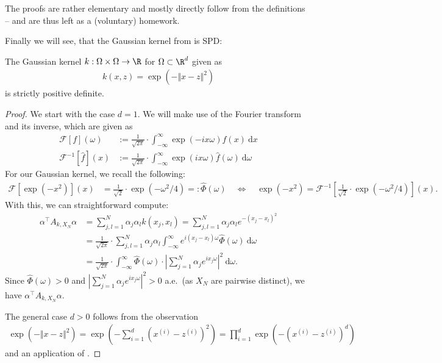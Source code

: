 The proofs are rather elementary and mostly directly follow from the definitions -- and are thus left as a (voluntary) homework.

Finally we will see, that the Gaussian kernel from  is SPD:

\begin{prop}
The Gaussian kernel $k: \Omega \times \Omega \rightarrow \R$ for $\Omega \subset \R^d$ given as
\begin{align*}
k(x, z) = \exp(-\Vert x - z \Vert^2)
\end{align*}
is strictly positive definite.
\end{prop}

\begin{proof}
We start with the case $d=1$.
We will make use of the Fourier transform and its inverse, which are given as
\begin{align*}
\mathcal{F}[f](\omega) &:= \frac{1}{\sqrt{2\pi}} \cdot \int_{-\infty}^\infty \exp(-ix\omega) f(x) ~ \mathrm{d}x \\
\mathcal{F}^{-1}[\hat{f}](x) &:= \frac{1}{\sqrt{2\pi}} \cdot \int_{-\infty}^\infty \exp(ix\omega) \hat{f}(\omega) ~ \mathrm{d}\omega
\end{align*}
For our Gaussian kernel, we recall the following:
\begin{align*}
\mathcal{F} \left[\exp(-x^2) \right](x) &=  \frac{1}{\sqrt{2}} \cdot \exp(-\omega^2 / 4) =: \hat{\Phi}(\omega) \quad \Leftrightarrow \quad
\exp(-x^2) = \mathcal{F}^{-1} \left[\frac{1}{\sqrt{2}} \cdot \exp(-\omega^2 / 4) \right](x).
\end{align*}
With this, we can straightforward compute:
\begin{align*}
\alpha^\top A_{k, X_N} \alpha &= \sum_{j, l=1}^N \alpha_j \alpha_l k(x_j, x_l) = \sum_{j, l=1}^N \alpha_j \alpha_l e^{-(x_j - x_l)^2} \\
&= \frac{1}{\sqrt{2\pi}} \cdot \sum_{j, l=1}^N \alpha_j \alpha_l \int_{-\infty}^\infty e^{i(x_j - x_l)\omega} \hat{\Phi}(\omega) ~ \mathrm{d}\omega \\
&= \frac{1}{\sqrt{2\pi}} \cdot \int_{-\infty}^\infty \hat{\Phi}(\omega) \cdot \left| \sum_{j=1}^N \alpha_j e^{ix_j \omega} \right|^2 ~ \mathrm{d}\omega.
\end{align*}
Since $\hat{\Phi}(\omega) > 0$ and $\left| \sum_{j=1}^N \alpha_j e^{ix_j \omega} \right|^2 > 0$ a.e.\ (as $X_N$ are pairwise distinct),
we have $\alpha^\top A_{k, X_N} \alpha$.

The general case $d>0$ follows from the observation
\begin{align*}
\exp(-\Vert x - z \Vert^2) = \exp(-\sum_{i=1}^d (x^{(i)} - z^{(i)})^2) = \prod_{i=1}^d \exp(-(x^{(i)} - z^{(i)})^d)
\end{align*}
and an application of .

\end{proof}

